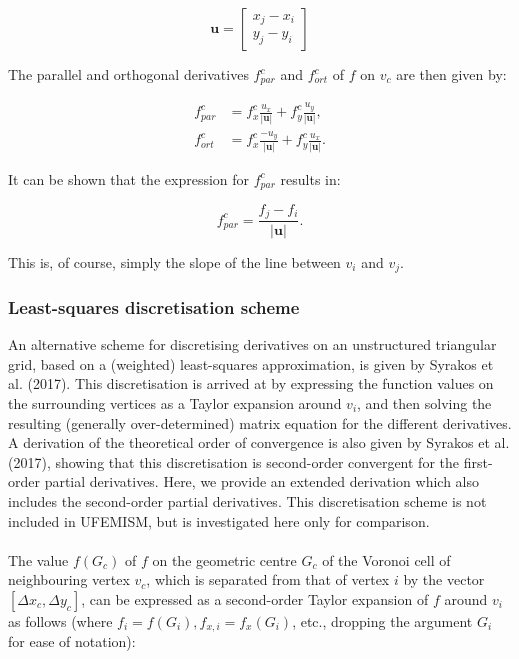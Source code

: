 \documentclass{article}
\begin{document}
\begin{equation} \label{eq:disc_U}
\textbf{u} = \begin{bmatrix} x_j - x_i \\ y_j - y_i \end{bmatrix}
\end{equation}

The parallel and orthogonal derivatives $f_{par}^c$ and $f_{ort}^c$ of $f$ on $v_c$ are then given by:

\begin{align} \label{eq:disc_fparcfortc}
f_{par}^c &= f_x^c \frac{u_x}{|\textbf{u}|} + f_y^c \frac{u_y}{|\textbf{u}|}, \\
f_{ort}^c &= f_x^c \frac{-u_y}{|\textbf{u}|} + f_y^c \frac{u_x}{|\textbf{u}|}.
\end{align}

It can be shown that the expression for $f_{par}^c$ results in:

\begin{equation} \label{eq:disc_fparc}
f_{par}^c = \frac{f_j - f_i}{|\textbf{u}|}.
\end{equation}

This is, of course, simply the slope of the line between $v_i$ and $v_j$.

\subsubsection{Least-squares discretisation scheme}

An alternative scheme for discretising derivatives on an unstructured triangular grid, based on a (weighted) least-squares approximation, is given by Syrakos et al. (2017). This discretisation is arrived at by expressing the function values on the surrounding vertices as a Taylor expansion around $v_i$, and then solving the resulting (generally over-determined) matrix equation for the different derivatives. A derivation of the theoretical order of convergence is also given by Syrakos et al. (2017), showing that this discretisation is second-order convergent for the first-order partial derivatives. Here, we provide an extended derivation which also includes the second-order partial derivatives. This discretisation scheme is not included in UFEMISM, but is investigated here only for comparison.\\
\\
The value $f(G_c)$ of $f$ on the geometric centre $G_c$ of the Voronoi cell of neighbouring vertex $v_c$, which is separated from that of vertex $i$ by the vector $\left[ \Delta x_c, \Delta y_c \right]$, can be expressed as a second-order Taylor expansion of $f$ around $v_i$ as follows (where $f_i = f(G_i), f_{x,i} = f_x(G_i)$, etc., dropping the argument $G_i$ for ease of notation):
\end{document}
